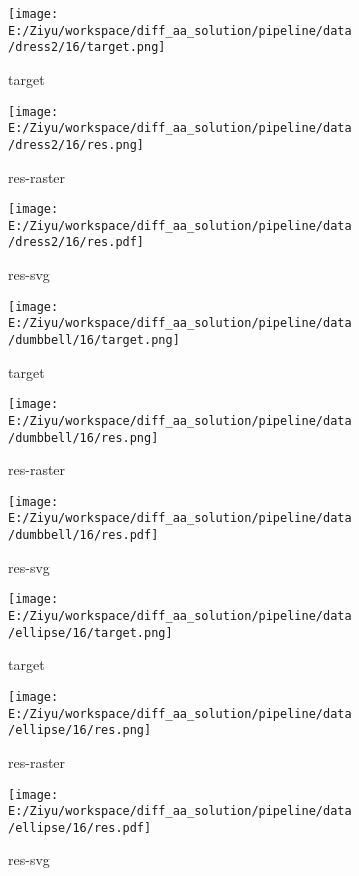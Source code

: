 \documentclass{article}%
\begin{document}
%


\begin{figure}[H]%
\begin{subfigure}[b]{0.32\linewidth}%
\texttt{[image: E:/Ziyu/workspace/diff\_aa\_solution/pipeline/data/dress2/16/target.png]}%
\caption{target}%
\end{subfigure}%
\begin{subfigure}[b]{0.32\linewidth}%
\texttt{[image: E:/Ziyu/workspace/diff\_aa\_solution/pipeline/data/dress2/16/res.png]}%
\caption{res{-}raster}%
\end{subfigure}%
\begin{subfigure}[b]{0.32\linewidth}%
\texttt{[image: E:/Ziyu/workspace/diff\_aa\_solution/pipeline/data/dress2/16/res.pdf]}%
\caption{res{-}svg}%
\end{subfigure}%
\par\vspace{1em}%
\caption{}%
\clearpage%
\end{figure}

%


\begin{figure}[H]%
\begin{subfigure}[b]{0.32\linewidth}%
\texttt{[image: E:/Ziyu/workspace/diff\_aa\_solution/pipeline/data/dumbbell/16/target.png]}%
\caption{target}%
\end{subfigure}%
\begin{subfigure}[b]{0.32\linewidth}%
\texttt{[image: E:/Ziyu/workspace/diff\_aa\_solution/pipeline/data/dumbbell/16/res.png]}%
\caption{res{-}raster}%
\end{subfigure}%
\begin{subfigure}[b]{0.32\linewidth}%
\texttt{[image: E:/Ziyu/workspace/diff\_aa\_solution/pipeline/data/dumbbell/16/res.pdf]}%
\caption{res{-}svg}%
\end{subfigure}%
\par\vspace{1em}%
\caption{}%
\end{figure}

%


\begin{figure}[H]%
\begin{subfigure}[b]{0.32\linewidth}%
\texttt{[image: E:/Ziyu/workspace/diff\_aa\_solution/pipeline/data/ellipse/16/target.png]}%
\caption{target}%
\end{subfigure}%
\begin{subfigure}[b]{0.32\linewidth}%
\texttt{[image: E:/Ziyu/workspace/diff\_aa\_solution/pipeline/data/ellipse/16/res.png]}%
\caption{res{-}raster}%
\end{subfigure}%
\begin{subfigure}[b]{0.32\linewidth}%
\texttt{[image: E:/Ziyu/workspace/diff\_aa\_solution/pipeline/data/ellipse/16/res.pdf]}%
\caption{res{-}svg}%
\end{subfigure}%
\par\vspace{1em}%
\caption{}%
\end{figure}
\end{document}
